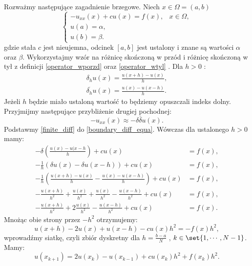 Rozważmy następujące zagadnienie brzegowe. Niech $ x \in \Omega = (a,b) $
\begin{equation} \label{boundary_diff_equa}
\left\{ \begin{array}{ll}
-u_{xx}(x) + cu(x) =f(x), & x \in \Omega,\\
u(a) = \alpha, & \\
u(b) = \beta. & 
\end{array} \right.
\end{equation}
gdzie stała $c$ jest nieujemna, odcinek $ [a,b]$ jest ustalony i znane są wartości $\alpha$ oraz $\beta$. Wykorzystajmy wzór na różnicę skończoną w przód i różnicę skończoną w tył z definicji \ref{operator_wporzd} oraz \ref{operator_wtyl} . Dla $h>0$ :
\begin{equation} \label{finite_diff}
\begin{array}{c}
\delta_h u(x) = \frac{u(x+h) - u(x)}{h},   \\
\overline{\delta_h} u(x) = \frac{u(x)-u(x-h)}{h} . 
\end{array}
\end{equation}
Jeżeli $h$ będzie miało ustaloną wartość to będziemy opuszczali indeks dolny. Przyjmijmy następujące przybliżenie drugiej pochodnej:
$$
-u_{xx}(x) \approx -\delta \overline{\delta} u(x).
$$
Podstawmy \eqref{finite_diff} do \eqref{boundary_diff_equa}. Wówczas dla ustalonego $h>0$ mamy: 
\begin{equation}
\begin{array}{rl}
-\delta (\frac{u(x)-u(x-h}{h}) + cu(x) &= f(x),  \\
- \frac{1}{h} (\delta u(x) - \delta u(x-h) ) + cu(x) &= f(x), \\
-\frac{1}{h} (\frac{u(x+h)-u(x)}{h} - \frac{u(x)-u(x-h)}{h}) + cu(x) &= f(x), \\
-\frac{u(x+h)}{h^2} + \frac{u(x)}{h^2} + \frac{u(x)}{h^2} - \frac{u(x-h)}{h^2} +cu(x)& = f(x), \\
-\frac{u(x+h)}{h^2} + 2\frac{u(x)}{h^2} - \frac{u(x-h)}{h^2} +cu(x) &= f(x) .
\end{array}
\end{equation}
Mnożąc obie strony przez $-h^2$ otrzymujemy:
\begin{equation}
u(x+h) - 2u(x) + u(x-h) - cu(x)h^2 = -f(x)h^2,
\end{equation}
wprowadźmy siatkę, czyli zbiór dyskretny dla $ h= \frac{b-a}{N}$ , $k \in \set{1,\cdots,N-1}$. Mamy: 
\begin{equation} \label{boundary_model}
u(x_{k+1}) = 2u(x_k) - u(x_{k-1}) + cu(x_k)h^2 + f(x_k)h^2.
\end{equation}
